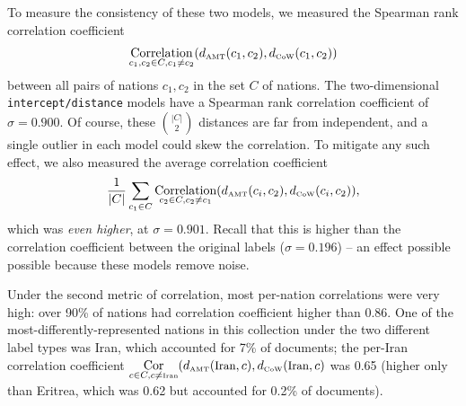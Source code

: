 To measure the consistency of these two models, we measured the
Spearman rank correlation coefficient 
\begin{align*}
\underset{c_1, c_2 \in C, c_1   \neq c_2}
{\operatorname{\mbox{Correlation}}}(d_{\mbox{\tiny AMT}}(c_1, c_2), d_{\mbox{\tiny CoW}}(c_1, c_2))
\end{align*}
between all pairs of nations $c_1, c_2$ in the set $C$ of
nations. The two-dimensional \verb!intercept/distance! models have
a Spearman rank correlation coefficient of $\sigma=0.900$.  Of course,
these $|C| \choose{2}$ distances are far from independent, and a
single outlier in each model could skew the correlation.  To mitigate
any such effect, we also measured the average correlation coefficient
\begin{align*}
  \frac{1}{|C|} \sum_{c_1 \in C}
  \underset{c_2 \in C, c_2 \neq c_1}
  {\operatorname{\mbox{Correlation}}}(d_{\mbox{\tiny AMT}}(c_i, c_2), d_{\mbox{\tiny
        CoW}}(c_i, c_2) ),
\end{align*}
which was \emph{even higher}, at $\sigma=0.901$. Recall that this is
higher than the correlation coefficient between the original labels
($\sigma=0.196$) -- an effect possible possible because these models
remove noise.

Under the second metric of correlation, most per-nation correlations
were very high: over 90\% of nations had correlation coefficient
higher than 0.86.  One of the most-differently-represented nations
in this collection under the two different label types was Iran, which
accounted for 7\% of documents; the per-Iran correlation coefficient
$\underset{c \in C, c \neq \mbox{\tiny Iran}}{\operatorname{\mbox{Cor}}}(d_{\mbox{\tiny AMT}}(\mbox{\small Iran}, c),
d_{\mbox{\tiny CoW}}(\mbox{\small Iran}, c)$ was 0.65 (higher only
than Eritrea, which was 0.62 but accounted for 0.2\% of documents).

